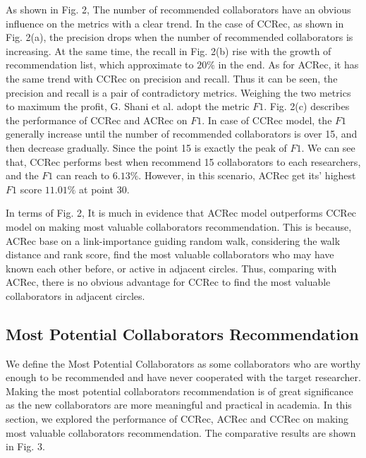 \documentclass{acm_proc_article-sp}
\begin{document}
As shown in Fig. 2, The number of recommended collaborators have an obvious influence on the metrics with a clear trend. In the case of CCRec, as shown in Fig. 2(a), the precision drops when the number of recommended collaborators is increasing. At the same time, the recall in Fig. 2(b) rise with the growth of recommendation list, which approximate to $20\%$ in the end. As for ACRec, it has the same trend with CCRec on precision and recall. Thus it can be seen, the precision and recall is a pair of contradictory metrics. Weighing the two metrics to maximum the profit, G. Shani et al. \cite{shani2011evaluating} adopt the metric $F1$. Fig. 2(c) describes the performance of CCRec and ACRec on $F1$. In case of CCRec model, the $F1$ generally increase until the number of recommended collaborators is over 15, and then decrease gradually. Since the point 15 is exactly the peak of $F1$. We can see that, CCRec performs best when recommend 15 collaborators to each researchers, and the $F1$ can reach to $6.13\%$. However, in this scenario, ACRec get its' highest $F1$ score $11.01\%$ at point 30.

In terms of Fig. 2, It is  much in evidence that ACRec model outperforms CCRec model on making most valuable collaborators recommendation. This is because, ACRec base on a link-importance guiding random walk, considering the walk distance and rank score, find the most valuable collaborators who may have known each other before, or active in adjacent circles. Thus, comparing with ACRec, there is no obvious advantage for CCRec to find the most valuable collaborators in adjacent circles.

\subsection{Most Potential Collaborators Recommendation}
We define the Most Potential Collaborators as some collaborators who are worthy enough to be recommended and have never cooperated with the target researcher.
Making the most potential collaborators recommendation is of great significance as the new collaborators are more meaningful and practical in academia. In this section, we explored the performance of CCRec, ACRec and CCRec on making most valuable collaborators recommendation. The comparative results are shown in Fig. 3.
\end{document}
